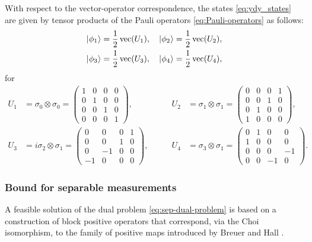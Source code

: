With respect to the vector-operator correspondence, the states \eqref{eq:ydy_states} are given
by tensor products of the Pauli operators \eqref{eq:Pauli-operators} as follows:
\begin{align}
\begin{split}
  \lvert\mspace{0.5mu} \phi_1 \mspace{0.5mu} \rangle = \frac{1}{2}\operatorname{vec}(U_1),\quad
   \lvert\mspace{0.5mu} \phi_2 \mspace{0.5mu} \rangle = \frac{1}{2}\operatorname{vec}(U_2),\\
  \lvert\mspace{0.5mu} \phi_3 \mspace{0.5mu} \rangle = \frac{1}{2}\operatorname{vec}(U_3),\quad
   \lvert\mspace{0.5mu} \phi_4 \mspace{0.5mu} \rangle = \frac{1}{2}\operatorname{vec}(U_4),
\end{split}
\end{align}
for
\begin{equation}
\label{eq:ydy-operators}
\begin{aligned}
  U_1 & = 
  \sigma_0\otimes\sigma_0 = 
  \begin{pmatrix}
    1 & 0 & 0 & 0 \\
    0 & 1 & 0 & 0 \\
    0 & 0 & 1 & 0 \\
    0 & 0 & 0 & 1
  \end{pmatrix}, & 
  U_2 & = 
  \sigma_1\otimes\sigma_1 =
  \begin{pmatrix}
    0 & 0 & 0 & 1 \\
    0 & 0 & 1 & 0 \\
    0 & 1 & 0 & 0 \\
    1 & 0 & 0 & 0
  \end{pmatrix},\\[3mm]
  U_3 & = 
  i \sigma_2 \otimes \sigma_1 =
  \begin{pmatrix}
    0 & 0 & 0 & 1 \\
    0 & 0 & 1 & 0 \\
    0 & -1 & 0 & 0 \\
    -1 & 0 & 0 & 0
  \end{pmatrix}, \qquad & 
  U_4 & = 
  \sigma_3 \otimes \sigma_1 =
  \begin{pmatrix}
    0 & 1 & 0 & 0 \\
    1 & 0 & 0 & 0 \\
    0 & 0 & 0 & -1 \\
    0 & 0 & -1 & 0
  \end{pmatrix}.
\end{aligned}
\end{equation}

\subsubsection*{Bound for separable measurements}
A feasible solution of the dual problem \eqref{eq:sep-dual-problem} is based on
a construction of block positive operators that correspond, via the Choi
isomorphism, to the family of positive maps introduced by Breuer and Hall
\cite{Breuer06,Hall06}.

